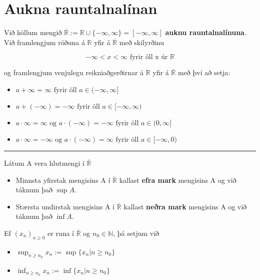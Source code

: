\documentclass[]{book}
\begin{document}
\hypertarget{aukna-rauntalnalinan}{%
\chapter{Aukna rauntalnalínan}\label{aukna-rauntalnalinan}}

Við köllum mengið \(\overline{\mathbb R} := \mathbb R \cup \{-\infty, \infty\} = [-\infty, \infty]\) \textbf{auknu rauntalnalínuna}. Við framlengjum röðuna á \(\mathbb R\) yfir á \(\overline{\mathbb R}\) með skilyrðinu

\[
-\infty < x < \infty \text{ fyrir öll x úr } \mathbb R
\]

og framlengjum venjulegu reikniaðgerðirnar á \(\mathbb R\) yfir á \(\overline{\mathbb R}\) með því að setja:

\begin{itemize}
\item
  \(a + \infty = \infty \text{ fyrir öll } a\in (-\infty, \infty]\)
\item
  \(a + (-\infty) = -\infty \text{ fyrir öll } a\in [-\infty, \infty)\)
\item
  \(a \cdot \infty = \infty \text{ og } a \cdot (-\infty) = -\infty \text{ fyrir öll } a\in (0, \infty]\)
\item
  \(a \cdot \infty = -\infty \text{ og } a \cdot (-\infty) = \infty \text{ fyrir öll } a\in [-\infty, 0)\)
\end{itemize}

\begin{center}\rule{0.5\linewidth}{\linethickness}\end{center}

Látum A vera hlutmengi í \(\overline{\mathbb R}\)

\begin{itemize}
\item
  Minnsta yfirstak mengisins A í \(\overline{\mathbb R}\) kallast \textbf{efra mark} mengisins A og við táknum það \(\sup A\).
\item
  Stærsta undirstak mengisins A í \(\overline{\mathbb R}\) kallast \textbf{neðra mark} mengisins A og við táknum það \(\inf A\).
\end{itemize}

Ef \((x_n)_{n\geq 0}\) er runa í \(\overline{\mathbb R}\) og \(n_0 \in \mathbb N\), þá setjum við

\begin{itemize}
\item
  \(\sup_{n\geq n_0}x_n := \sup\{x_n | n \geq n_0\}\)
\item
  \(\inf_{n\geq n_0}x_n := \inf\{x_n | n \geq n_0\}\)
\end{itemize}
\end{document}
